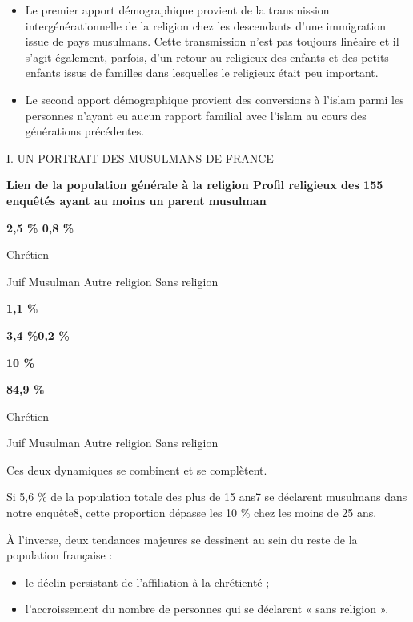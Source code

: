 \begin{itemize}
\item
  
  Le premier apport démographique provient de la transmission
  intergénérationnelle de la religion chez les descendants d'une
  immigration issue de pays musulmans. Cette transmission n'est pas
  toujours linéaire et il s'agit également, parfois, d'un retour au
  religieux des enfants et des petits-enfants issus de familles dans
  lesquelles le religieux était peu important.
  
\item
  
  Le second apport démographique provient des conversions à l'islam
  parmi les personnes n'ayant eu aucun rapport familial avec l'islam au
  cours des générations précédentes.
  
\end{itemize}


I. UN PORTRAIT DES MUSULMANS DE FRANCE

\textbf{Lien de la population générale à la religion Profil religieux
des 155 enquêtés ayant au moins un parent musulman}

\textbf{2,5 \% 0,8 \%}

Chrétien

Juif Musulman Autre religion Sans religion

\textbf{1,1 \%}


\textbf{3,4 \%0,2 \%}


\textbf{10 \%}


\textbf{84,9 \%}


Chrétien

Juif Musulman Autre religion Sans religion

Ces deux dynamiques se combinent et se complètent.

Si 5,6 \% de la population totale des plus de 15 ans7 se déclarent
musulmans dans notre enquête8, cette proportion dépasse les 10 \% chez
les moins de 25 ans.

À l'inverse, deux tendances majeures se dessinent au sein du reste de la
population française :


\begin{itemize}
\item
  
  le déclin persistant de l'affiliation à la chrétienté ;
  
\item
  
  l'accroissement du nombre de personnes qui se déclarent « sans
  religion ».
  
\end{itemize}


